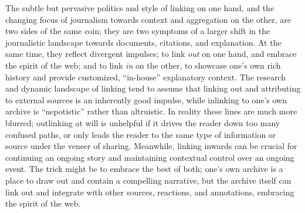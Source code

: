 The subtle but pervasive politics and style of linking on one hand, and the changing focus of journalism towards context and aggregation on the other, are two sides of the same coin; they are two symptoms of a larger shift in the journalistic landscape towards documents, citations, and explanation. At the same time, they reflect divergent impulses; to link \emph{out} on one hand, and embrace the spirit of the web; and to link \emph{in} on the other, to showcase one's own rich history and provide customized, ``in-house'' explanatory context. The research and dynamic landscape of linking tend to assume that linking out and attributing to external sources is an inherently good impulse, while inlinking to one's own archive is ``nepotistic'' rather than altruistic.\autocite[213]{chakrabarti_mining_2003} In reality these lines are much more blurred; outlinking at will is unhelpful if it drives the reader down too many confused paths, or only leads the reader to the same type of information or source under the veneer of sharing. Meanwhile, linking inwards can be crucial for continuing an ongoing story and maintaining contextual control over an ongoing event. The trick might be to embrace the best of both; one's own archive is a place to draw out and contain a compelling narrative, but the archive itself can link out and integrate with other sources, reactions, and annotations, embracing the spirit of the web.





